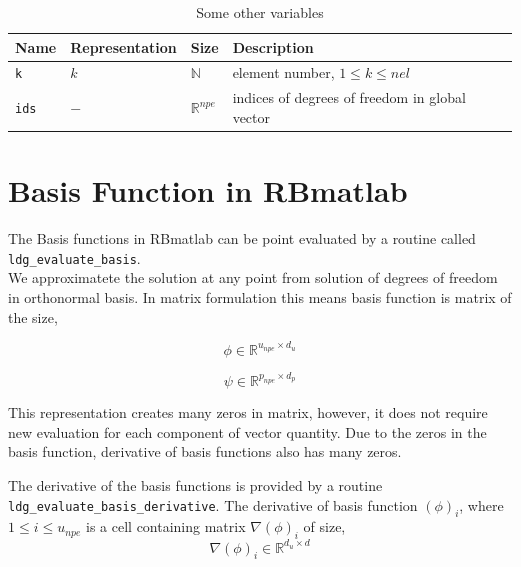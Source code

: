 \documentclass[a4paper]{book}
\begin{document}
\begin{table}[H]
\caption{Some other variables}
\label{table_variable}
\begin{center}
\begin{tabular}{| p{}| p{} |  p{} | p{}|}
\hline
\textbf{Name} & \textbf{Representation} & \textbf{Size} & \textbf{Description}\\
\hline
\verb|k| & $k$ & $\mathbb{N}$ & element number, $1 \leq k \leq nel$\\
\hline
\verb|ids| & $-$ & $\mathbb{R}^{npe}$ & indices of degrees of freedom in global vector\\
\hline
\end{tabular}
\end{center}
\end{table}

\section{Basis Function in RBmatlab}

The Basis functions in RBmatlab can be point evaluated by a routine called \verb|ldg_evaluate_basis|.\\

We approximatete the solution at any point from solution of degrees of freedom in orthonormal basis. In matrix formulation this means basis function is matrix of the size,

\begin{equation}\label{basis_func_velocity_rbmatlab}
\phi \in \mathbb{R}^{u_{npe} \times d_u}
\end{equation}

\begin{equation}\label{basis_func_pressure_rbmatlab}
\psi \in \mathbb{R}^{p_{npe} \times d_p}
\end{equation}

This representation creates many zeros in matrix, however, it does not require new evaluation for each component of vector quantity. Due to the zeros in the basis function, derivative of basis functions also has many zeros.

The derivative of the basis functions is provided by a routine \linebreak \verb|ldg_evaluate_basis_derivative|. The derivative of basis function $(\phi)_{i}$, where $1 \leq i \leq u_{npe}$ is a cell containing matrix $\nabla (\phi)_{i}$ of size,
\begin{equation}\label{basis_func_derivative_velocity_rbmatlab}
\nabla (\phi)_{i} \in \mathbb{R}^{{d_u} \times d}
\end{equation}
\end{document}
